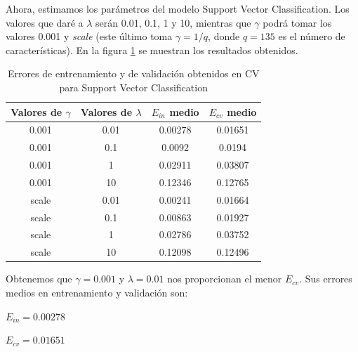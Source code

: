 \documentclass[10pt,a4paper]{article}
\begin{document}
Ahora, estimamos los parámetros del modelo Support Vector Classification. Los valores que daré a $\lambda$ serán 0.01, 0.1, 1 y 10, mientras que $\gamma$ podrá tomar los valores 0.001 y \textit{scale} (este último toma $\gamma = 1/q$, donde $q=135$ es el número de características). En la figura \ref{fig:cla_svc_cv} se muestran los resultados obtenidos.

\begin{table}[h]
	\centering
	\begin{tabular}{|c|c|c|c|}
		\hline
		\textbf{Valores de $\gamma$} & \textbf{Valores de $\lambda$} & \textbf{$E_{in}$ medio} & \textbf{$E_{cv}$ medio} \\ \hline
		0.001                        & 0.01                          & 0.00278                 & 0.01651                 \\ \hline
		0.001                        & 0.1                           & 0.0092                  & 0.0194                  \\ \hline
		0.001                        & 1                             & 0.02911                 & 0.03807                 \\ \hline
		0.001                        & 10                            & 0.12346                 & 0.12765                 \\ \hline
		scale                        & 0.01                          & 0.00241                 & 0.01664                 \\ \hline
		scale                        & 0.1                           & 0.00863                 & 0.01927                 \\ \hline
		scale                        & 1                             & 0.02786                 & 0.03752                 \\ \hline
		scale                        & 10                            & 0.12098                 & 0.12496                 \\ \hline
	\end{tabular}
	\caption{Errores de entrenamiento y de validación obtenidos en CV para Support Vector Classification}
	\label{fig:cla_svc_cv}
\end{table}

Obtenemos que $\gamma = 0.001$ y $\lambda = 0.01$ nos proporcionan el menor $E_{cv}$. Sus errores medios en entrenamiento y validación son:

$E_{in} = 0.00278$

$E_{cv} = 0.01651$
\end{document}
